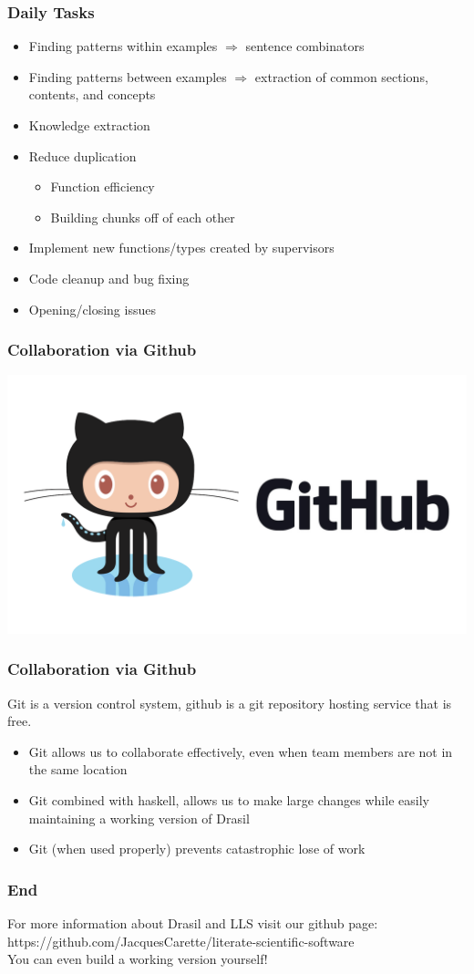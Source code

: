 \documentclass{beamer}
\begin{document}
\begin{frame}
\frametitle{Daily Tasks}
\begin{itemize}
 \item<1-> Finding patterns within examples $\Rightarrow$ sentence combinators
 \item<2-> Finding patterns between examples $\Rightarrow$ extraction of common sections, contents, and concepts
 \item<3-> Knowledge extraction
 \item<4-> Reduce duplication
   \begin{itemize}
     \item Function efficiency
     \item Building chunks off of each other
   \end{itemize}
 \item<5-> Implement new functions/types created by supervisors
 \item<6-> Code cleanup and bug fixing
 \item<7-> Opening/closing issues
\end{itemize}
\end{frame}


\begin{frame}
\frametitle{Collaboration via Github}
\includegraphics[scale=0.2]{./Github_Logo.png}
\end{frame}

\begin{frame}
\frametitle{Collaboration via Github}
Git is a version control system, github is a git repository hosting service that is \alert{free}.
\begin{itemize}
 \item<1-> Git allows us to collaborate effectively, even when team members are not in the same location
 \item<2-> Git combined with haskell, allows us to make large changes while easily maintaining a working version of Drasil
 \item<3-> Git \alert{(when used properly)} prevents catastrophic lose of work
\end{itemize}
\end{frame}

\begin{frame}
\frametitle{End}
For more information about Drasil and LLS visit our github page: \\
https://github.com/JacquesCarette/literate-scientific-software \\
\alert{You can even build a working version yourself!}
\end{frame}
\end{document}
